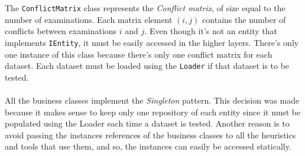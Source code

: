 The \verb+ConflictMatrix+ class represents the \textit{Conflict matrix}, of size equal to the number of examinations. Each matrix element $(i,j)$ contains the number of conflicts between examinations $i$ and $j$. Even though it's not an entity that implements \verb+IEntity+, it must be easily accessed in the higher layers. There's only one instance of this class because there's only one conflict matrix for each dataset. Each dataset must be loaded using the \verb+Loader+ if that dataset is to be tested.\\
\\
All the business classes implement the \textit{Singleton} pattern. This decision was made because it makes sense to keep only one repository of each entity since it must be populated using the Loader each time a dataset is tested. Another reason is to avoid passing the instances references of the business classes to all the heuristics and tools that use them, and so, the instances can easily be accessed statically.
